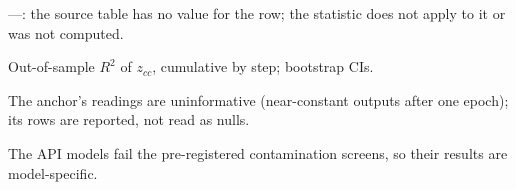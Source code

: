 \endgroup
\vspace{-0.5\baselineskip}
{\footnotesize\raggedright
---: the source table has no value for the row; the statistic does not apply to it or was not computed.\par
Out-of-sample $R^2$ of $z_{cc}$, cumulative by step; bootstrap CIs.\par
The anchor's readings are uninformative (near-constant outputs after one epoch); its rows are reported, not read as nulls.\par
The API models fail the pre-registered contamination screens, so their results are model-specific.\par
}
